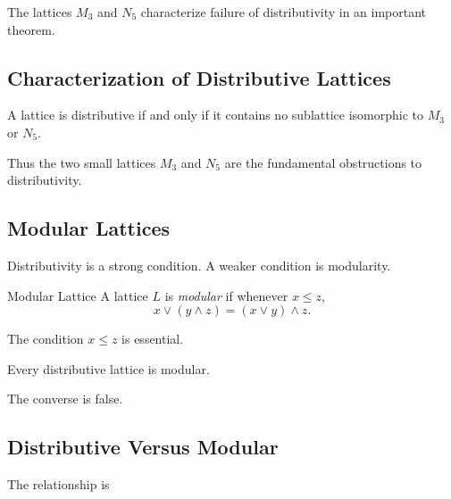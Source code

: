 The lattices \(M_3\) and \(N_5\) characterize failure of distributivity in
an important theorem.

\subsection{Characterization of Distributive Lattices}
\label{subsec:distributive-characterization}

\begin{theorem}
A lattice is distributive if and only if it contains no sublattice
isomorphic to \(M_3\) or \(N_5\).
\end{theorem}

Thus the two small lattices \(M_3\) and \(N_5\) are the fundamental
obstructions to distributivity.

\subsection{Modular Lattices}
\label{subsec:modular-lattices}

Distributivity is a strong condition. A weaker condition is modularity.

\begin{definitionbox}{Modular Lattice}
A lattice \(L\) is \emph{modular} if whenever \(x\leq z\),
\[ x\vee(y\wedge z)=(x\vee y)\wedge z. \]
\end{definitionbox}

The condition \(x\leq z\) is essential.

Every distributive lattice is modular.

The converse is false.

\subsection{Distributive Versus Modular}
\label{subsec:distributive-versus-modular}

The relationship is

\begin{center}
\end{center}

